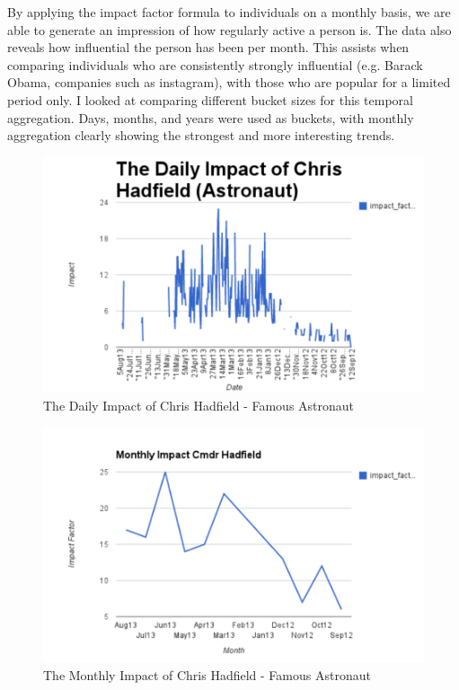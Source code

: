 By applying the impact factor formula to individuals on a monthly basis, we are able to generate an impression of how regularly active a person is. The data also reveals how influential the person has been per month. This assists when comparing individuals who are consistently strongly influential (e.g. Barack Obama, companies such as instagram), with those who are popular for a limited period only. I looked at comparing different bucket sizes for this temporal aggregation. Days, months, and years were used as buckets, with monthly aggregation clearly showing the strongest and more interesting trends. 

\begin{figure}[h!]
\centering
\includegraphics{Images/daily_impact_chris_hadfield.pdf}
\caption{The Daily Impact of Chris Hadfield - Famous Astronaut}
\end{figure}

\begin{figure}[h!]
\centering
\includegraphics{Images/monthly_impact_chris_hadfield.pdf}
\caption{The Monthly Impact of Chris Hadfield - Famous Astronaut}
\end{figure}


